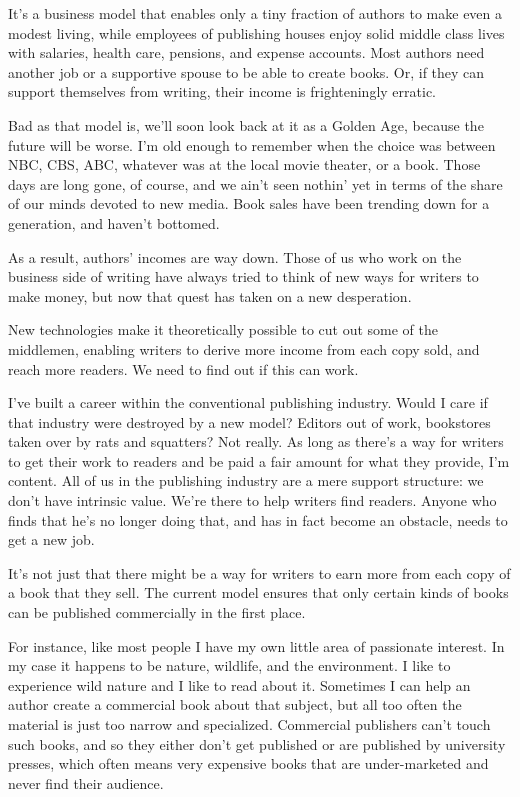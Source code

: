 It's a business model that enables only a tiny fraction of authors to 
make even a modest living, while employees of publishing houses enjoy 
solid middle class lives with salaries, health care, pensions, and 
expense accounts. Most authors need another job or a supportive spouse 
to be able to create books. Or, if they can support themselves from 
writing, their income is frighteningly erratic.

Bad as that model is, we'll soon look back at it as a Golden Age, 
because the future will be worse. I'm old enough to remember when the 
choice was between NBC, CBS, ABC, whatever was at the local movie 
theater, or a book. Those days are long gone, of course, and we ain't 
seen nothin' yet in terms of the share of our minds devoted to new 
media. Book sales have been trending down for a generation, and haven't 
bottomed.

As a result, authors' incomes are way down. Those of us who work on the 
business side of writing have always tried to think of new ways for 
writers to make money, but now that quest has taken on a new 
desperation.

New technologies make it theoretically possible to cut out some of the 
middlemen, enabling writers to derive more income from each copy sold, 
and reach more readers. We need to find out if this can work.

I've built a career within the conventional publishing industry. Would 
I care if that industry were destroyed by a new model? Editors out of 
work, bookstores taken over by rats and squatters? Not really. As long 
as there's a way for writers to get their work to readers and be paid a 
fair amount for what they provide, I'm content. All of us in the 
publishing industry are a mere support structure: we don't have 
intrinsic value. We're there to help writers find readers. Anyone who 
finds that he's no longer doing that, and has in fact become an 
obstacle, needs to get a new job.

It's not just that there might be a way for writers to earn more from 
each copy of a book that they sell. The current model ensures that only 
certain kinds of books can be published commercially in the first place.

For instance, like most people I have my own little area of passionate 
interest. In my case it happens to be nature, wildlife, and the 
environment. I like to experience wild nature and I like to read about 
it. Sometimes I can help an author create a commercial book about that 
subject, but all too often the material is just too narrow and 
specialized. Commercial publishers can't touch such books, and so they 
either don't get published or are published by university presses, 
which often means very expensive books that are under-marketed and 
never find their audience.

